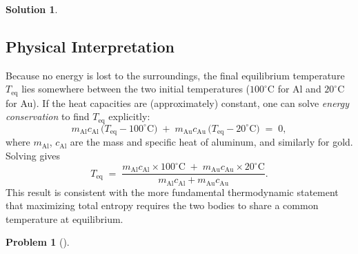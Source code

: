 \documentclass[12pt]{article}
\theoremstyle{definition} %
\newtheorem{solution}{Solution}
\newtheorem{problem}{Problem}
\theoremstyle{plain} %
\begin{document}
\begin{solution}
\subsection*{Physical Interpretation}

Because no energy is lost to the surroundings, the final equilibrium temperature 
$T_{\mathrm{eq}}$ lies somewhere between the two initial temperatures 
($100^\circ\mathrm{C}$ for Al and $20^\circ\mathrm{C}$ for Au). 
If the heat capacities are (approximately) constant, one can solve 
\emph{energy conservation} to find $T_{\mathrm{eq}}$ explicitly:
\[
m_{\mathrm{Al}} c_{\mathrm{Al}}\,\bigl(T_{\mathrm{eq}} - 100^\circ\mathrm{C}\bigr)
\;+\;
m_{\mathrm{Au}} c_{\mathrm{Au}}\,\bigl(T_{\mathrm{eq}} - 20^\circ\mathrm{C}\bigr)
\;=\; 0,
\]
where $m_{\mathrm{Al}}$, $c_{\mathrm{Al}}$ are the mass and specific heat 
of aluminum, and similarly for gold. Solving gives
\[
T_{\mathrm{eq}} 
\;=\;
\frac{
m_{\mathrm{Al}} c_{\mathrm{Al}} \times 100^\circ\mathrm{C}
\;+\;
m_{\mathrm{Au}} c_{\mathrm{Au}} \times 20^\circ\mathrm{C}
}{
m_{\mathrm{Al}} c_{\mathrm{Al}} + m_{\mathrm{Au}} c_{\mathrm{Au}}}.
\]
This result is consistent with the more fundamental thermodynamic statement 
that maximizing total entropy requires the two bodies to share a common 
temperature at equilibrium.
\end{solution}
\begin{problem}[]
    
\end{problem}
\end{document}
